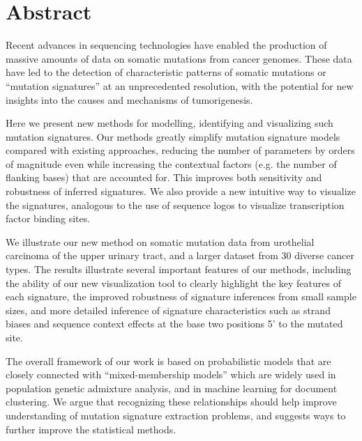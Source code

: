 \documentclass[10pt,letterpaper]{article}
\begin{document}
\section*{Abstract}

Recent advances in sequencing technologies have enabled
the production of
massive amounts of data on somatic mutations from cancer genomes. These data have led to the detection of characteristic patterns of somatic mutations or ``mutation signatures'' at an unprecedented resolution, with the
potential for new insights into
the causes and mechanisms of tumorigenesis.

Here we present new methods for modelling, identifying and visualizing such mutation signatures. Our methods
greatly simplify mutation signature models compared with existing approaches, reducing the number of parameters by orders of magnitude even while increasing the contextual factors (e.g. the number of flanking bases) that are accounted for. This improves both sensitivity and robustness of inferred signatures. We also provide a new intuitive way to visualize the signatures, analogous to the use of sequence logos to visualize transcription factor binding sites. 

We illustrate our new method on somatic mutation data from urothelial carcinoma of the upper urinary tract, and a
larger dataset from 30 diverse cancer types.
The results illustrate several important features
of our methods, including the ability of our new visualization
tool to clearly highlight the key features of each signature,
the improved robustness of signature inferences from small sample sizes, and more detailed inference of signature characteristics such as strand biases and sequence context effects at the base two positions 5' to the mutated site.

The overall framework of our work is based on probabilistic models that are closely
connected with ``mixed-membership models'' which are widely used in population genetic admixture analysis, and in machine learning for document clustering. We argue that recognizing these relationships should help improve
understanding of mutation signature extraction problems,
and suggests ways to further improve the statistical methods.
\end{document}
